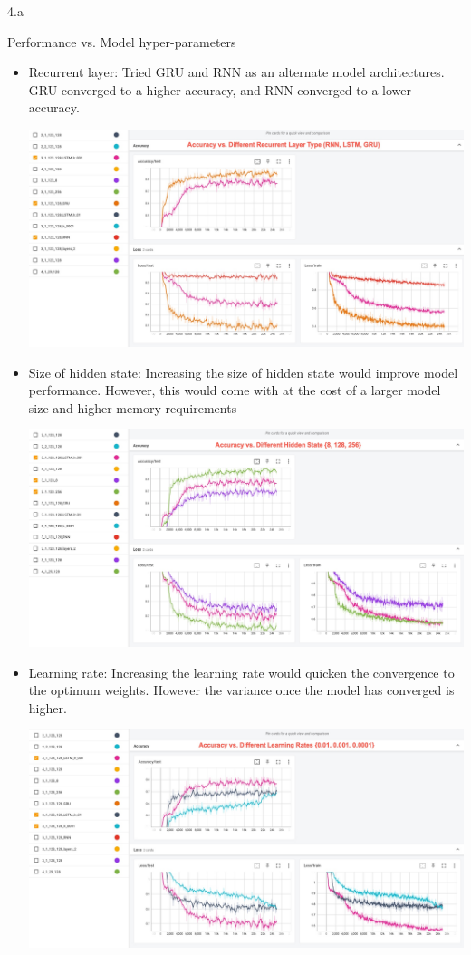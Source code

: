 \clearpage

\LARGE
4.a
\normalsize

\begin{answer}
Performance vs. Model hyper-parameters
\begin{itemize}
    \item Recurrent layer: Tried GRU and RNN as an alternate model architectures. GRU converged to a higher accuracy, and RNN converged to a lower accuracy. 

    \includegraphics[width=16cm]{figures/hp_model_arch.jpg}
    
    \item Size of hidden state: Increasing the size of hidden state would improve model performance. However, this would come with at the cost of a larger model size and higher memory requirements
    
    \includegraphics[width=16cm]{figures/hp_hidden_dim.jpg}
    
    \item Learning rate: Increasing the learning rate would quicken the convergence to the optimum weights. However the variance once the model has converged is higher. 

    \includegraphics[width=16cm]{figures/hp_lr.jpg}
    

\end{itemize}
\end{answer}
